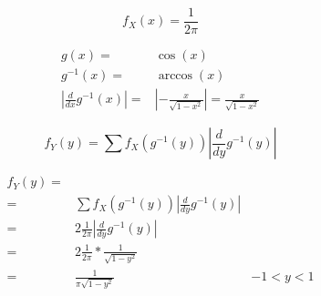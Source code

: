 \documentclass{article}
\begin{document}
    \begin{equation}
      f_X(x) = \frac{1}{2\pi}
    \end{equation}


    \begin{align}
      g(x) =& \cos(x) \\
      g^{-1}(x) =& \arccos(x) \\
      \left| \frac{d}{dx} g^{-1} (x) \right| =& \left| - \frac{x}{\sqrt{1-x^2}} \right| =  \frac{x}{\sqrt{1-x^2}}
    \end{align}

    \begin{equation}
    \label{eq:density_transformation_technique}
      f_Y (y) = \sum f_X \left( g^{-1} (y) \right) \left| \frac{d}{dy} g^{-1} (y) \right|
    \end{equation}

    \begin{figure}
      \center
      \caption{}
      \label{}
    \end{figure}

    \begin{align}
      f_Y (y) =& &\\
              =& \sum f_X \left( g^{-1} (y) \right) \left| \frac{d}{dy} g^{-1} (y) \right| &\\
              =& 2\frac{1}{2\pi} \left| \frac{d}{dy} g^{-1} (y) \right| &\\
              =& 2\frac{1}{2\pi}*\frac{1}{\sqrt{1-y^2}} &\\
              =& \frac{1}{\pi\sqrt{1-y^2}} & -1<y<1
    \end{align}
  \nocite{prob2017}

  
  
\end{document}
